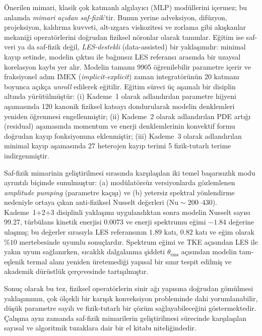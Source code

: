 \documentclass[12pt,a4paper]{report}
\begin{document}
Önerilen mimari, klasik çok katmanlı algılayıcı (MLP) modüllerini içermez; bu anlamda \emph{mimari açıdan saf-fizik}'tir. Bunun yerine adveksiyon, difüzyon, projeksiyon, kaldırma kuvveti, alt-ızgara viskozitesi ve zorlama gibi akışkanlar mekaniği operatörlerini doğrudan fiziksel nöronlar olarak tanımlar. Eğitim ise saf-veri ya da saf-fizik değil, \emph{LES-destekli} (data-assisted) bir yaklaşımdır: minimal kayıp setinde, modelin çıktısı ile bağımsız LES referansı arasında bir uzaysal korelasyon kaybı yer alır. Modelin tamamı 9905 öğrenilebilir parametre içerir ve fraksiyonel adım
IMEX (\textit{implicit-explicit}) zaman integratörünün 20 katmanı boyunca açıkça
\textit{unroll} edilerek eğitilir. Eğitim süreci üç aşamalı bir disiplin altında
yürütülmüştür: (i) Kademe~1 olarak adlandırılan parametre hijyeni aşamasında 120
kanonik fiziksel katsayı dondurularak modelin denklemleri yeniden öğrenmesi
engellenmiştir; (ii) Kademe~2 olarak adlandırılan PDE artığı (residual) aşamasında
momentum ve enerji denklemlerinin konvektif formu doğrudan kayıp fonksiyonuna
eklenmiştir; (iii) Kademe~3 olarak adlandırılan minimal kayıp aşamasında 27
heterojen kayıp terimi 5 fizik-tutarlı terime indirgenmiştir.

Saf-fizik mimarinin geliştirilmesi sırasında karşılaşılan iki temel başarısızlık
modu ayrıntılı biçimde sunulmuştur: (a) modülatörsüz versiyonlarda gözlemlenen
\textit{amplitude pumping} (parametre kaçışı) ve (b) yetersiz spektral
yönlendirme nedeniyle ortaya çıkan anti-fiziksel Nusselt değerleri
($\mathrm{Nu} \sim 200\text{--}430$). Kademe~1+2+3 disiplinli yaklaşımı
uygulandıktan sonra modelin Nusselt sayısı 99.27, türbülans kinetik
enerjisi 0.0073 ve enerji spektrumu eğimi $-1.84$ değerine ulaşmış; bu değerler
sırasıyla LES referansının $1.89$ katı, $0.82$ katı ve eğim olarak $\%10$
mertebesinde uyumlu sonuçlardır. Spektrum eğimi ve TKE açısından LES ile yakın
uyum sağlanırken, sıcaklık dalgalanma şiddeti $\theta_{\mathrm{rms}}$ açısından
modelin tam-eşlenik termal alanı yeniden üretemediği yapısal bir sınır tespit
edilmiş ve akademik dürüstlük çerçevesinde tartışılmıştır.

Sonuç olarak bu tez, fiziksel operatörlerin sinir ağı yapısına doğrudan gömülmesi
yaklaşımının, çok ölçekli bir karışık konveksiyon probleminde dahi yorumlanabilir,
düşük parametre sayılı ve fizik-tutarlı bir çözüm sağlayabileceğini göstermektedir.
Çalışma aynı zamanda saf-fizik mimarilerin geliştirilmesi sürecinde karşılaşılan
sayısal ve algoritmik tuzaklara dair bir el kitabı niteliğindedir.
\end{document}
